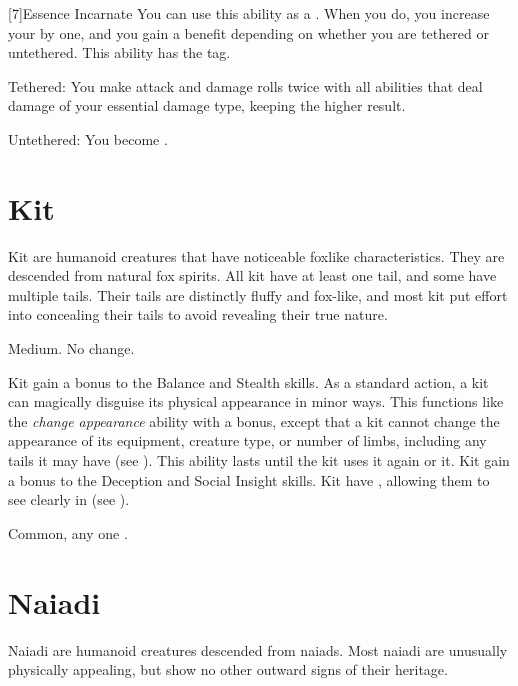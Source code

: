     [7]{Essence Incarnate} You can use this ability as a .
    When you do, you increase your  by one, and you gain a benefit depending on whether you are tethered or untethered.
    This ability has the  tag.
    \begin{raggeditemize}
        \item Tethered: You  make attack and damage rolls twice with all abilities that deal damage of your essential damage type, keeping the higher result.
        \item Untethered: You  become .
    \end{raggeditemize}

\section{Kit}

    Kit are humanoid creatures that have noticeable foxlike characteristics.
    They are descended from natural fox spirits.
    All kit have at least one tail, and some have multiple tails.
    Their tails are distinctly fluffy and fox-like, and most kit put effort into concealing their tails to avoid revealing their true nature.

     Medium.
     No change.
    \begin{itemize}
         Kit gain a  bonus to the Balance and Stealth skills.
         As a standard action, a kit can magically disguise its physical appearance in minor ways.
            This functions like the \textit{change appearance} ability with a  bonus, except that a kit cannot change the appearance of its equipment, creature type, or number of limbs, including any tails it may have (see ).
            This ability lasts until the kit uses it again or  it.
         Kit gain a  bonus to the Deception and Social Insight skills.
         Kit have , allowing them to see clearly in  (see ).
    \end{itemize}
     Common, any one .

\section{Naiadi}
    Naiadi are humanoid creatures descended from naiads.
    Most naiadi are unusually physically appealing, but show no other outward signs of their heritage.

